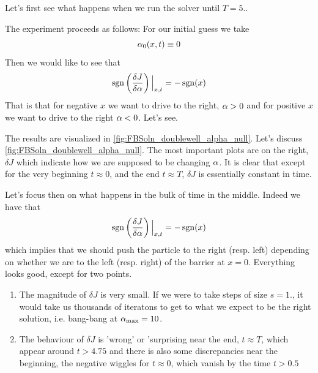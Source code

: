 \documentclass{article}
\begin{document}
Let's first see what happens when we run the solver until $T = 5$..

The experiment proceeds as follows: For our initial guess we take $${\alpha}_0(x,t)
\equiv 0$$ Then we would like to see that 
$$ \operatorname{sgn} \left(\frac {\delta J}{\delta {\alpha}}\right) \Big|_{x,t} = - \operatorname{sgn}(x)$$
That is that for negative $x$ we want to drive to the right, ${\alpha} > 0$ and for
positive $x$ we want to drive to the right ${\alpha} < 0$. 
Let's see.  

The results are visualized in \cref{fig:FBSoln_doublewell_alpha_null}. Let's
discuss \cref{fig:FBSoln_doublewell_alpha_null}. The most important plots are on
the right, $\delta J$ which indicate how we are supposed to be changing ${\alpha}$. 
It is clear that except for the very beginning $t \approx 0$, and the end $t
\approx T$, $\delta J$ is essentially constant in time.  

Let's focus then on what happens in the bulk of time in the middle. Indeed we  
have that 
$$
\operatorname{sgn} \left(\frac {\delta J}{\delta {\alpha}}\right) \Big|_{x,t} = - \operatorname{sgn}(x)
$$
which implies that we should push the particle to the right (resp. left)
depending on whether we are to the left (resp. right) of the barrier at $x=0$.
Everything looks good, except for two points.
\begin{enumerate}
  \item The magnitude of $\delta J$ is very small. If we were to take steps of
  size $s=1.$, it would take us thousands of iteratons to get to what we expect to be
the right solution, i.e. bang-bang at ${ {\alpha}_{\textrm{max}} } = 10$.
\item The behaviour of $\delta J$ is 'wrong' or 'surprising near the end, $t
\approx T$, which appear around $t>4.75$ and there is also some discrepancies
near the beginning, the negative wiggles for $t \approx 0$, which vanish by the
time $t > 0.5$
\end{enumerate}
\end{document}
